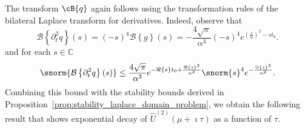 The transform $\cB\{q\}$ again follows using the transformation rules of the bilateral Laplace transform for derivatives. Indeed, observe that
\begin{equation}
	\mathcal{B}
	\left\{
		\partial^2_t  q 
	\right\}(s)
	=
	(-s)^{4}
	\mathcal{B}
	\left\{
		g
	\right\}(s)
	=
	-\frac{4\sqrt{\pi}}{\alpha^3}
	(-s)^{4}
	e^{
		{\left(\frac{s}{\alpha}\right)^2-s t_0}
	}.
\end{equation}
and for each $s \in \mathbb{C}$
\begin{equation}\label{eq:bound_g_n}
	\snorm{
	\mathcal{B}
	\left\{
		\partial^2_t  q
	\right\}(s)
	}
	\leq
	\frac{4\sqrt{\pi}}{\alpha^3}
	e^{-\Re\{s\} t_0+\frac{\Re\{s\}^2}{\alpha^2}}
	\snorm{s}^{4}
	e^{-\frac{\Im\{s\}^2}{\alpha^2}}.
\end{equation}
Combining this bound with the stability bounds derived in Proposition~\ref{prop:stability_laplace_domain_problem}, we obtain the following result that shows exponential decay of $\widehat{U}^{(2)}(\mu+\imath\tau)$ as a function of $\tau$.

